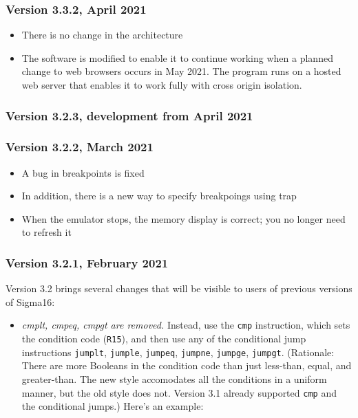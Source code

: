 \documentclass[11pt]{article}
\begin{document}
\subsubsection*{Version 3.3.2, April 2021}
\label{sec:org4bd2544}
\begin{itemize}
\item There is no change in the architecture
\item The software is modified to enable it to continue working when a
planned change to web browsers occurs in May 2021.  The program runs
on a hosted web server that enables it to work fully with cross
origin isolation.
\end{itemize}
\subsubsection*{Version 3.2.3, development from April 2021}
\label{sec:org813520c}
\subsubsection*{Version 3.2.2, March 2021}
\label{sec:org2ea0fea}

\begin{itemize}
\item A bug in breakpoints is fixed
\item In addition, there is a new way to specify breakpoings using trap
\item When the emulator stops, the memory display is correct; you no
longer need to refresh it
\end{itemize}

\subsubsection*{Version 3.2.1, February 2021}
\label{sec:orgcc63812}

Version 3.2 brings several changes that will be visible to users of
previous versions of Sigma16:

\begin{itemize}
\item \emph{cmplt, cmpeq, cmpgt are removed.} Instead, use the \texttt{cmp}
instruction, which sets the condition code (\texttt{R15}), and then use any
of the conditional jump instructions \texttt{jumplt}, \texttt{jumple}, \texttt{jumpeq},
\texttt{jumpne}, \texttt{jumpge}, \texttt{jumpgt}.  (Rationale: There are more Booleans
in the condition code than just less-than, equal, and greater-than.
The new style accomodates all the conditions in a uniform manner,
but the old style does not.  Version 3.1 already supported \texttt{cmp} and
the conditional jumps.)  Here's an example:
\end{itemize}
\end{document}
